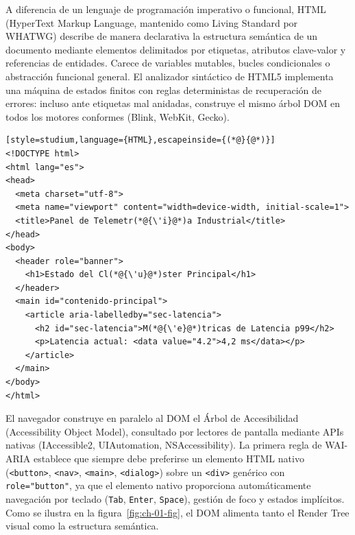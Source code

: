 \documentclass{book}
\begin{document}
A diferencia de un lenguaje de programación imperativo o funcional, HTML (HyperText Markup Language, mantenido como Living Standard por WHATWG) describe de manera declarativa la estructura semántica de un documento mediante elementos delimitados por etiquetas, atributos clave-valor y referencias de entidades. Carece de variables mutables, bucles condicionales o abstracción funcional general. El analizador sintáctico de HTML5 implementa una máquina de estados finitos con reglas deterministas de recuperación de errores: incluso ante etiquetas mal anidadas, construye el mismo árbol DOM en todos los motores conformes (Blink, WebKit, Gecko).
\begin{lstlisting}[style=studium,language={HTML},escapeinside={(*@}{@*)}]
<!DOCTYPE html>
<html lang="es">
<head>
  <meta charset="utf-8">
  <meta name="viewport" content="width=device-width, initial-scale=1">
  <title>Panel de Telemetr(*@{\'i}@*)a Industrial</title>
</head>
<body>
  <header role="banner">
    <h1>Estado del Cl(*@{\'u}@*)ster Principal</h1>
  </header>
  <main id="contenido-principal">
    <article aria-labelledby="sec-latencia">
      <h2 id="sec-latencia">M(*@{\'e}@*)tricas de Latencia p99</h2>
      <p>Latencia actual: <data value="4.2">4,2 ms</data></p>
    </article>
  </main>
</body>
</html>
\end{lstlisting}
El navegador construye en paralelo al DOM el Árbol de Accesibilidad (Accessibility Object Model), consultado por lectores de pantalla mediante APIs nativas (IAccessible2, UIAutomation, NSAccessibility). La primera regla de WAI-ARIA establece que siempre debe preferirse un elemento HTML nativo (\texttt{<button>}, \texttt{<nav>}, \texttt{<main>}, \texttt{<dialog>}) sobre un \texttt{<div>} genérico con \texttt{role="button"}, ya que el elemento nativo proporciona automáticamente navegación por teclado (\texttt{Tab}, \texttt{Enter}, \texttt{Space}), gestión de foco y estados implícitos. Como se ilustra en la figura~\ref{fig:ch-01-fig}, el DOM alimenta tanto el Render Tree visual como la estructura semántica.
\end{document}
